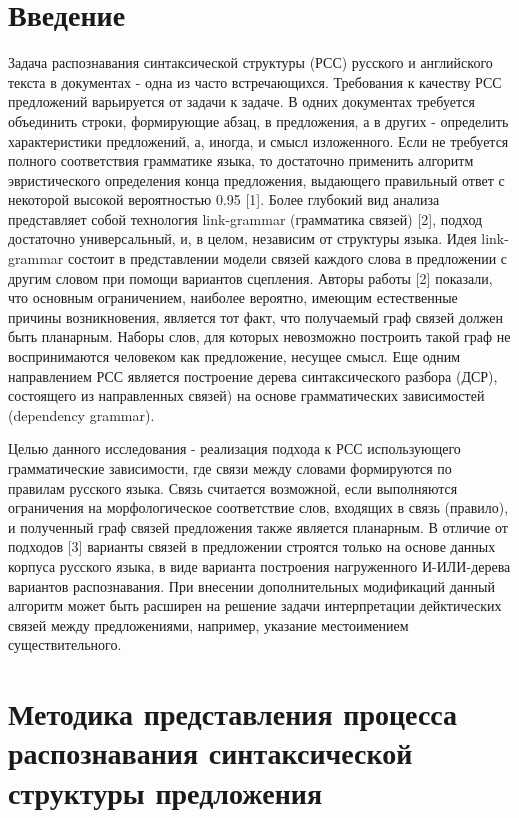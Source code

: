 \documentclass[
]{ceurart}
\begin{document}
\section{Введение}

Задача распознавания синтаксической структуры (РСС) русского и
английского текста в документах - одна из часто встречающихся.
Требования к качеству РСС предложений варьируется от задачи к задаче. В
одних документах требуется объединить строки, формирующие абзац, в
предложения, а в других - определить характеристики предложений, а,
иногда, и смысл изложенного. Если не требуется полного соответствия
грамматике языка, то достаточно применить алгоритм эвристического
определения конца предложения, выдающего правильный ответ с некоторой
высокой вероятностью 0.95 {[}1{]}. Более глубокий вид анализа
представляет собой технология link-grammar (грамматика связей) {[}2{]},
подход достаточно универсальный, и, в целом, независим от структуры
языка. Идея link-grammar состоит в представлении модели связей каждого
слова в предложении с другим словом при помощи вариантов сцепления.
Авторы работы {[}2{]} показали, что основным ограничением, наиболее
вероятно, имеющим естественные причины возникновения, является тот факт,
что получаемый граф связей должен быть планарным. Наборы слов, для
которых невозможно построить такой граф не воспринимаются человеком как
предложение, несущее смысл. Еще одним направлением РСС является
построение дерева синтаксического разбора (ДСР), состоящего из
направленных связей) на основе грамматических зависимостей (dependency
grammar).

Целью данного исследования - реализация подхода к РСС использующего
грамматические зависимости, где связи между словами формируются по
правилам русского языка. Связь считается возможной, если выполняются
ограничения на морфологическое соответствие слов, входящих в связь
(правило), и полученный граф связей предложения также является
планарным. В отличие от подходов {[}3{]} варианты связей в предложении
строятся только на основе данных корпуса русского языка, в виде варианта
построения нагруженного И-ИЛИ-дерева вариантов распознавания. При
внесении дополнительных модификаций данный алгоритм может быть расширен
на решение задачи интерпретации дейктических связей между предложениями,
например, указание местоимением существительного.

\section{Методика представления процесса распознавания синтаксической
структуры предложения}
\end{document}
